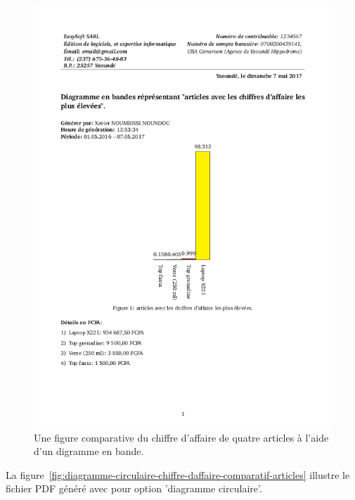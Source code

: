 \begin{figure}[!htbp]
	\centering
	\includegraphics[scale=0.65]{images/diagramme-bande-chiffre-daffaire-comparatif-articles.png}
	\caption{Une figure comparative du chiffre d'affaire de
		quatre articles \`a l'aide d'un digramme en bande.}
	\label{fig:diagramme-bande-chiffre-daffaire-comparatif-articles}
\end{figure}

La figure~\ref{fig:diagramme-circulaire-chiffre-daffaire-comparatif-articles}
illustre le fichier PDF g\'en\'er\'e avec pour option 'diagramme circulaire'.

